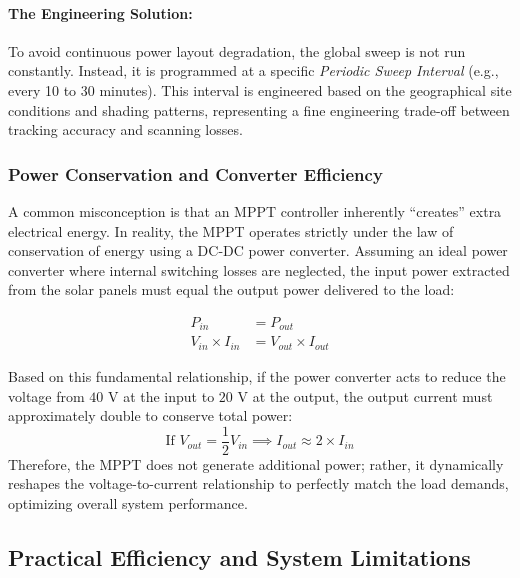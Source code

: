 \paragraph{The Engineering Solution:}
To avoid continuous power layout degradation, the global sweep is not run constantly. Instead, it is programmed at a specific \textit{Periodic Sweep Interval} (e.g., every 10 to 30 minutes). This interval is engineered based on the geographical site conditions and shading patterns, representing a fine engineering trade-off between tracking accuracy and scanning losses.

\subsubsection{Power Conservation and Converter Efficiency}
A common misconception is that an MPPT controller inherently ``creates'' extra electrical energy. In reality, the MPPT operates strictly under the law of conservation of energy using a DC-DC power converter. Assuming an ideal power converter where internal switching losses are neglected, the input power extracted from the solar panels must equal the output power delivered to the load:

\begin{align}
    P_{in} &= P_{out} \\
    V_{in} \times I_{in} &= V_{out} \times I_{out}
\end{align}

\newpage

Based on this fundamental relationship, if the power converter acts to reduce the voltage from $40\text{ V}$ at the input to $20\text{ V}$ at the output, the output current must approximately double to conserve total power:
\begin{equation}
    \text{If } V_{out} = \frac{1}{2}V_{in} \implies I_{out} \approx 2 \times I_{in}
\end{equation}
Therefore, the MPPT does not generate additional power; rather, it dynamically reshapes the voltage-to-current relationship to perfectly match the load demands, optimizing overall system performance.

\subsection{Practical Efficiency and System Limitations}

